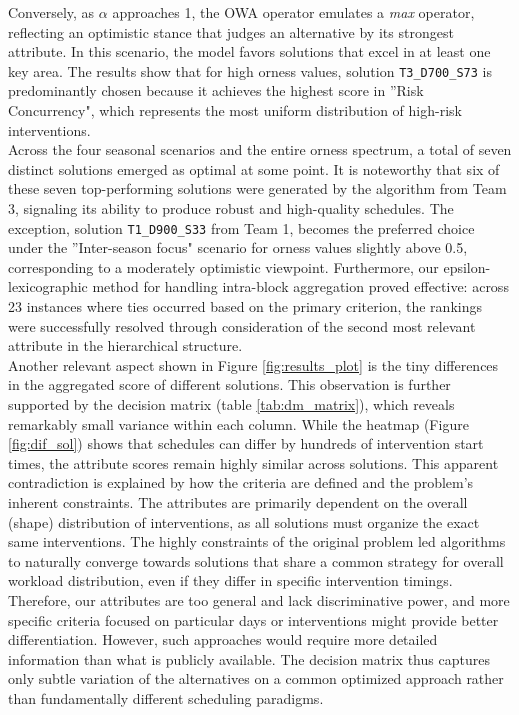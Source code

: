 Conversely, as $\alpha$ approaches 1, the OWA operator emulates a \textit{max} operator, reflecting an optimistic stance that judges an alternative by its strongest attribute. In this scenario, the model favors solutions that excel in at least one key area. The results show that for high orness values, solution \texttt{T3\_D700\_S73} is predominantly chosen because it achieves the highest score in ''Risk Concurrency", which represents the most uniform distribution of high-risk interventions.\\

Across the four seasonal scenarios and the entire orness spectrum, a total of seven distinct solutions emerged as optimal at some point. It is noteworthy that six of these seven top-performing solutions were generated by the algorithm from Team 3, signaling its ability to produce robust and high-quality schedules. The exception, solution \texttt{T1\_D900\_S33} from Team 1, becomes the preferred choice under the ''Inter-season focus" scenario for orness values slightly above 0.5, corresponding to a moderately optimistic viewpoint. Furthermore, our epsilon-lexicographic method for handling intra-block aggregation proved effective: across 23 instances where ties occurred based on the primary criterion, the rankings were successfully resolved through consideration of the second most relevant attribute in the hierarchical structure.\\

Another relevant aspect shown in Figure \ref{fig:results_plot} is the tiny differences in the aggregated score of different solutions. This observation is further supported by the decision matrix (table \ref{tab:dm_matrix}), which reveals remarkably small variance within each column. While the heatmap (Figure \ref{fig:dif_sol}) shows that schedules can differ by hundreds of intervention start times, the attribute scores remain highly similar across solutions. This apparent contradiction is explained by how the criteria are defined and the problem's inherent constraints. The attributes are primarily dependent on the overall (shape) distribution of interventions, as all solutions must organize the exact same interventions. The highly constraints of the original problem led algorithms to naturally converge towards solutions that share a common strategy for overall workload distribution, even if they differ in specific intervention timings. Therefore, our attributes are too general and lack discriminative power, and more specific criteria focused on particular days or interventions might provide better differentiation. However, such approaches would require more detailed information than what is publicly available. The decision matrix thus captures only subtle variation of the alternatives on a common optimized approach rather than fundamentally different scheduling paradigms. \\

